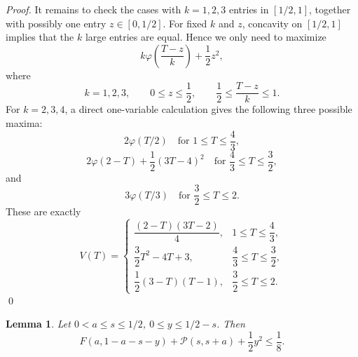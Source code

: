 \documentclass[runningheads,envcountsame,a4paper]{llncs}
\newtheorem{lem}[thm]{Lemma}
\begin{document}
\begin{proof}
It remains to check the cases with \(k=1,2,3\) entries in \([1/2,1]\), together
with possibly one entry \(z\in[0,1/2]\).  For fixed \(k\) and \(z\), concavity on
\([1/2,1]\) implies that the \(k\) large entries are equal.  Hence we only need
to maximize
\[
k\varphi\left(\frac{T-z}{k}\right)+\frac12z^2,
\]
where
\[
k=1,2,3,\qquad
0\le z\le\frac12,
\qquad
\frac12\le\frac{T-z}{k}\le 1.
\]
\fi
For $k=2,3,4$, a direct one-variable calculation gives the following three possible maxima:
\[
2\varphi(T/2)
\quad
\text{for }
1\le T\le \frac43,
\]
\[
2\varphi(2-T)+\frac12(3T-4)^2
\quad
\text{for }
\frac43\le T\le \frac32,
\]
and
\[
3\varphi(T/3)
\quad
\text{for }
\frac32\le T\le 2.
\]
These are exactly
\[
V(T)=
\begin{cases}
\dfrac{(2-T)(3T-2)}{4},
& 1\le T\le \dfrac43,\\[8pt]
\dfrac32T^2-4T+3,
& \dfrac43\le T\le \dfrac32,\\[8pt]
\dfrac12(3-T)(T-1),
& \dfrac32\le T\le 2.
\end{cases}
\]\qed
\end{proof}

\begin{lem}\label{lem:one-eighth-reduction}
Let \(0<a\le s\le 1/2\), \(0\le y\le 1/2-s\).
Then
\[
F(a,1-a-s-y)+\mathcal P(s,s+a)+\frac12y^2\le \frac18.
\]
\end{lem}
\end{document}
